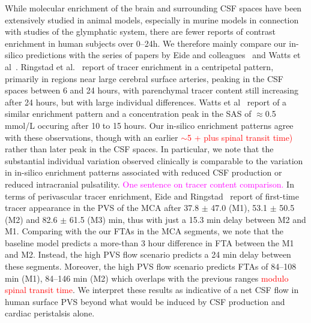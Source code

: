 \documentclass[fleqn,10pt]{wlscirep}
\newcommand{\mer}[1]{\textcolor{magenta}{#1}}
\newcommand{\discuss}[1]{\textcolor{red}{#1}}
\begin{document}
While molecular enrichment of the brain and surrounding CSF spaces
have been extensively studied in animal models, especially in murine
models in connection with studies of the glymphatic system, there are
fewer reports of contrast enrichment in human subjects over 0--24h. We
therefore mainly compare our in-silico predictions with the series of
papers by Eide and colleagues~\cite{ringstad2017glymphatic,
  ringstad2018brain, eide2021sleep, eide2024functional} and Watts et
al~\cite{watts2019measuring}. Ringstad et al.~\cite{ringstad2018brain}
report of tracer enrichment in a centripetal pattern, primarily in
regions near large cerebral surface arteries, peaking in the CSF
spaces between 6 and 24 hours, with parenchymal tracer content still
increasing after 24 hours, but with large individual
differences. Watts et al~\cite{watts2019measuring} report of a similar
enrichment pattern and a concentration peak in the SAS of $\approx$0.5
mmol/L occuring after 10 to 15 hours. Our in-silico enrichment
patterns agree with these observations, though with an earlier
\discuss{$\sim$5 + plus spinal transit time)} rather than later peak
in the CSF spaces. In particular, we note that the substantial
individual variation observed clinically is comparable to the
variation in in-silico enrichment patterns associated with reduced CSF
production or reduced intracranial pulsatility. \mer{One sentence on
  tracer content comparison.} In terms of perivascular tracer
enrichment, Eide and Ringstad~\cite{eide2024functional} report of
first-time tracer appearance in the PVS of the MCA after 37.8 $\pm$
47.0 (M1), 53.1 $\pm$ 50.5 (M2) and 82.6 $\pm$ 61.5 (M3) min, thus
with just a 15.3 min delay between M2 and M1. Comparing with the our
FTAs in the MCA segments, we note that the baseline model predicts a
more-than 3 hour difference in FTA between the M1 and M2. Instead, the
high PVS flow scenario predicts a 24 min delay between these
segments. Moreover, the high PVS flow scenario predicts FTAs of
84--108 min (M1), 84--146 min (M2) which overlaps with the previous
ranges \discuss{modulo spinal transit time}. We interpret these
results as indicative of a net CSF flow in human surface PVS beyond
what would be induced by CSF production and cardiac peristalsis alone.
\end{document}
